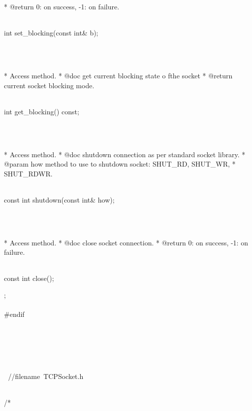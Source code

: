 \documentclass{article}
\begin{document}
{	  * @return 0: on success, -1: on failure.
	  \strut\goodbreak
{}\strut\nopagebreak\\
         int set_blocking(const int& b);
\strut\\\strut\\* Access method.
	  * @doc get current blocking state o fthe socket
	  * @return current socket blocking mode.
	  \strut\goodbreak
{}\strut\nopagebreak\\
         int get_blocking() const;
\strut\\\strut\\* Access method.
	  * @doc shutdown connection as per standard socket library.
	  * @param how method to use to shutdown socket: SHUT_RD, SHUT_WR, 
	  * SHUT_RDWR.
	  \strut\goodbreak
{}\strut\nopagebreak\\
     const int shutdown(const int& how);
\strut\\\strut\\* Access method.
	  * @doc close socket connection.
	  * @return 0: on success, -1: on failure.
	  \strut\goodbreak
{}\strut\nopagebreak\\
     const int close();
\\
 };
\\
 
\\
 #endif
\\
 
\\
 
\\
\strut\\
\strut\goodbreak
{}\strut\nopagebreak\\
 
\hbox{//$$filename TCPSocket.h}\strut\\
\hbox{/*}
\end{document}
